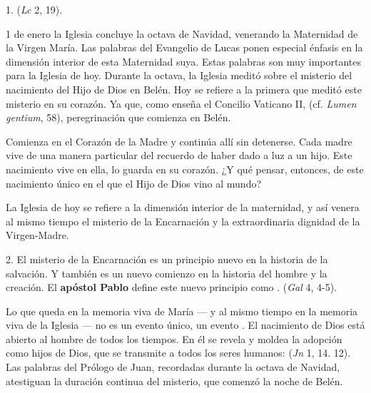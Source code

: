 
\begin{body}
	1.  (\emph{Lc} 2, 19).
	
	 1 de enero la Iglesia concluye la octava de Navidad, venerando la Maternidad de la Virgen María. Las palabras del Evangelio de Lucas ponen especial énfasis en la dimensión interior de esta Maternidad suya. Estas palabras son muy importantes para la Iglesia de hoy. Durante la octava, la Iglesia meditó sobre el misterio del nacimiento del Hijo de Dios en Belén. Hoy se refiere a la primera que meditó este misterio en su corazón. Ya que, como enseña el Concilio Vaticano II,  (cf. \emph{Lumen gentium}, 58), peregrinación que comienza en Belén.
	
	Comienza en el Corazón de la Madre y continúa allí sin detenerse. Cada madre vive de una manera particular del recuerdo de haber dado a luz a un hijo. Este nacimiento vive en ella, lo guarda en su corazón. ¿Y qué pensar, entonces, de este nacimiento único en el que el Hijo de Dios vino al mundo?
	
	La Iglesia de hoy se refiere a la dimensión interior de la maternidad, y así venera al mismo tiempo el misterio de la Encarnación y la extraordinaria dignidad de la Virgen-Madre.
	
	2. El misterio de la Encarnación es un principio nuevo en la historia de la salvación. Y también es un nuevo comienzo en la historia del hombre y la creación. El \textbf{apóstol Pablo} define este nuevo principio como .  (\emph{Gal} 4, 4-5).
	
	Lo que queda en la memoria viva de María --- y al mismo tiempo en la memoria viva de la Iglesia --- no es un evento único, un evento . El nacimiento de Dios está abierto al hombre de todos los tiempos. En él se revela y moldea la adopción como hijos de Dios, que se transmite a todos los seres humanos:  (\emph{Jn} 1, 14. 12). Las palabras del Prólogo de Juan, recordadas durante la octava de Navidad, atestiguan la duración continua del misterio, que comenzó la noche de Belén.
	

\end{body}
